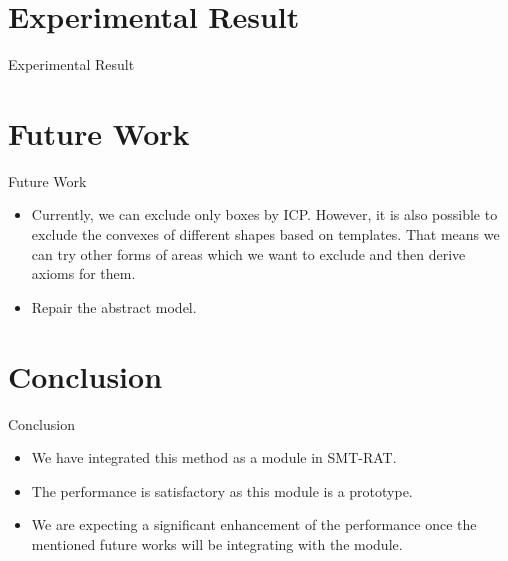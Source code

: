 \documentclass[]{beamer}
\begin{document}
\section{Experimental Result}
\begin{frame}{Experimental Result}
\end{frame}

\section{Future Work}
\begin{frame}{Future Work}
    \begin{itemize}
        \item Currently, we can exclude only boxes by ICP. 
        However, it is also possible to exclude the convexes of different shapes based on templates.
        That means we can try other forms of areas which we want to exclude and then derive axioms for them.
        \item Repair the abstract model.
    \end{itemize} 
\end{frame}

\section{Conclusion}
\begin{frame}{Conclusion}
    \begin{itemize}
        \item We have integrated this method as a module in SMT-RAT.
        \item The performance is satisfactory as this module is a prototype.
        \item We are expecting a significant enhancement of the performance once the mentioned future works will be integrating with the module.
    \end{itemize}
\end{frame}
\end{document}
